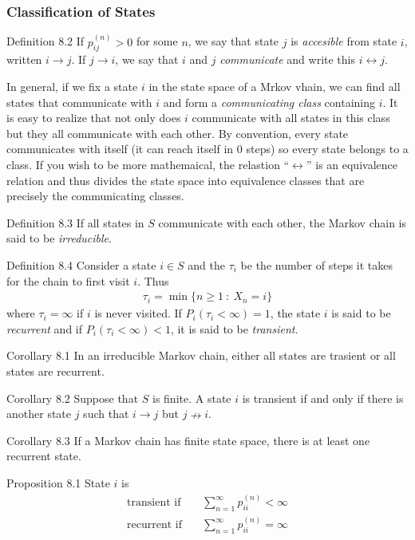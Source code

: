 \subsubsection{Classification of States}
\begin{boks}{Definition 8.2}
  If $p_{ij}^{(n)} > 0$ for some $n$, we say that state $j$ is \textit{accesible} from state $i$, written $i \rightarrow j$. If $j \rightarrow i$, we say that $i$ and $j$ \textit{communicate} and write this $i \leftrightarrow j$.
\end{boks}
In general, if we fix a state $i$ in the state space of a Mrkov vhain, we can find all states that communicate with $i$ and form a \textit{communicating class} containing $i$. It is easy to realize that not only does $i$ communicate with all states in this class but they all communicate with each other. By convention, every state communicates with itself (it can reach itself in $0$ steps) so every state belongs to a class.
If you wish to be more mathemaical, the relastion ``$\leftrightarrow$'' is an equivalence relation and thus divides the state space into equivalence classes that are precisely the communicating classes.
\begin{boks}{Definition 8.3}
  If all states in $S$ communicate with each other, the Markov chain is said to be \textit{irreducible}.
\end{boks}
\begin{boks}{Definition 8.4}
  Consider a state $i \in S$ and the $\tau_i$ be the number of steps it takes for the chain to first visit $i$. Thus
  \begin{align*}
    \tau_i = \min \{ n \geq 1 \ : \ X_n = i \}
  \end{align*}
  where $\tau_i = \infty$ if $i$ is never visited. If $P_i(\tau_i < \infty) = 1$, the state $i$ is said to be \textit{recurrent} and if $P_i(\tau_i < \infty) < 1$, it is said to be \textit{transient}.
\end{boks}
\begin{boks}{Corollary 8.1}
  In an irreducible Markov chain, either all states are trasient or all states are recurrent.
\end{boks}
\begin{boks}{Corollary 8.2}
  Suppose that $S$ is finite. A state $i$ is transient if and only if there is another state $j$ such that $i \rightarrow j$ but $j \nrightarrow i$.
\end{boks}
\begin{boks}{Corollary 8.3}
  If a Markov chain has finite state space, there is at least one recurrent state.
\end{boks}
\begin{boks}{Proposition 8.1}
  State $i$ is
  \begin{align*}
    \text{transient if} \quad &\sum_{n = 1}^\infty p_{ii}^{(n)} < \infty \\
    \text{recurrent if} \quad &\sum_{n = 1}^\infty p_{ii}^{(n)} = \infty
  \end{align*}
\end{boks}

